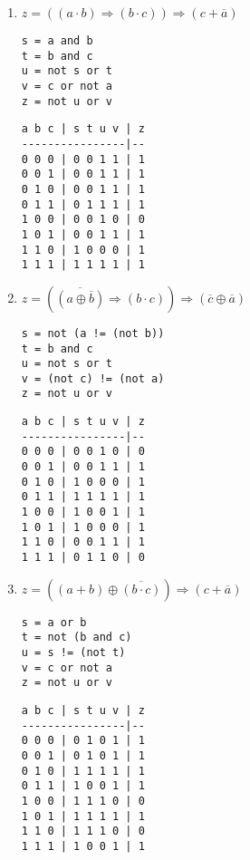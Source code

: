 \documentclass[11pt,a4paper]{article}
\begin{document}
\begin{enumerate}
\item $z = ((a \cdot b) \Rightarrow (b \cdot c)) \Rightarrow ({c} + \overline{a})$
\hfill
\begin{minipage}[t]{4cm}\footnotesize
\begin{Verbatim}
s = a and b
t = b and c
u = not s or t
v = c or not a
z = not u or v
\end{Verbatim}
\end{minipage}
\hspace*{3mm}
\begin{minipage}[t]{3.5cm}\footnotesize
\begin{Verbatim}
a b c | s t u v | z
----------------|--
0 0 0 | 0 0 1 1 | 1
0 0 1 | 0 0 1 1 | 1
0 1 0 | 0 0 1 1 | 1
0 1 1 | 0 1 1 1 | 1
1 0 0 | 0 0 1 0 | 0
1 0 1 | 0 0 1 1 | 1
1 1 0 | 1 0 0 0 | 1
1 1 1 | 1 1 1 1 | 1
\end{Verbatim}
\end{minipage}
\vspace*{3mm}

\item $z = (\overline{(a \oplus \overline{b})} \Rightarrow (b \cdot c)) \Rightarrow (\overline{c} \oplus \overline{a})$
\hfill
\begin{minipage}[t]{4cm}\footnotesize
\begin{Verbatim}
s = not (a != (not b))
t = b and c
u = not s or t
v = (not c) != (not a)
z = not u or v
\end{Verbatim}
\end{minipage}
\hspace*{3mm}
\begin{minipage}[t]{3.5cm}\footnotesize
\begin{Verbatim}
a b c | s t u v | z
----------------|--
0 0 0 | 0 0 1 0 | 0
0 0 1 | 0 0 1 1 | 1
0 1 0 | 1 0 0 0 | 1
0 1 1 | 1 1 1 1 | 1
1 0 0 | 1 0 0 1 | 1
1 0 1 | 1 0 0 0 | 1
1 1 0 | 0 0 1 1 | 1
1 1 1 | 0 1 1 0 | 0
\end{Verbatim}
\end{minipage}
\vspace*{3mm}

\item $z = ({(a + b)} \oplus \overline{(b \cdot c)}) \Rightarrow ({c} + \overline{a})$
\hfill
\begin{minipage}[t]{4cm}\footnotesize
\begin{Verbatim}
s = a or b
t = not (b and c)
u = s != (not t)
v = c or not a
z = not u or v
\end{Verbatim}
\end{minipage}
\hspace*{3mm}
\begin{minipage}[t]{3.5cm}\footnotesize
\begin{Verbatim}
a b c | s t u v | z
----------------|--
0 0 0 | 0 1 0 1 | 1
0 0 1 | 0 1 0 1 | 1
0 1 0 | 1 1 1 1 | 1
0 1 1 | 1 0 0 1 | 1
1 0 0 | 1 1 1 0 | 0
1 0 1 | 1 1 1 1 | 1
1 1 0 | 1 1 1 0 | 0
1 1 1 | 1 0 0 1 | 1
\end{Verbatim}
\end{minipage}
\vspace*{3mm}


\end{enumerate}
\end{document}
